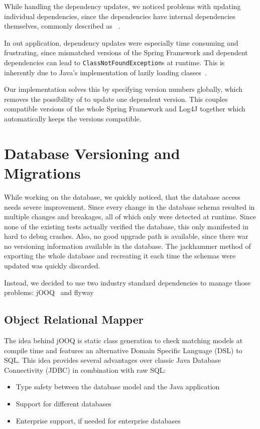While handling the dependency updates, we noticed problems with updating individual dependencies, since the dependencies
have internal dependencies themselves, commonly described as ~\cite{jang2006linux}.

In out application, dependency updates were especially time consuming and frustrating, since mismatched versions of the
Spring Framework and dependent dependencies can lead to \lstinline{ClassNotFoundException}s at runtime.
This is inherently due to Java's implementation of lazily loading classes~\cite{gosling2014java}.

Our implementation solves this by specifying version numbers globally, which removes the possibility of 
to update one dependent version.
This couples compatible versions of the whole Spring Framework and Log4J together which automatically keeps the versions
compatible.

\section{Database Versioning and Migrations}\label{sec:databaseVersioningAndMigrations}
While working on the database, we quickly noticed, that the database access needs severe improvement.
Since every change in the database schema resulted in multiple changes and breakages, all of which only were detected at
runtime.
Since none of the existing tests actually verified the database, this only manifested in hard to debug crashes.
Also, no good upgrade path is available, since there war no versioning information available in the database.
The jackhammer method of exporting the whole database and recreating it each time the schemas were updated was quickly
discarded.

Instead, we decided to use two industry standard dependencies to manage those problems: jOOQ~\cite{jooq} and
flyway~\cite{flyway}

\subsection*{Object Relational Mapper}
The idea behind jOOQ is static class generation to check matching models at compile time and features an alternative
Domain Specific Language (DSL) to SQL\@.
This idea provides several advantages over classic Java Database Connectivity (JDBC) in combination with raw SQL:
\begin{itemize}
\item Type safety between the database model and the Java application
\item Support for different databases
\item Enterprise support, if needed for enterprise databases
\end{itemize}

